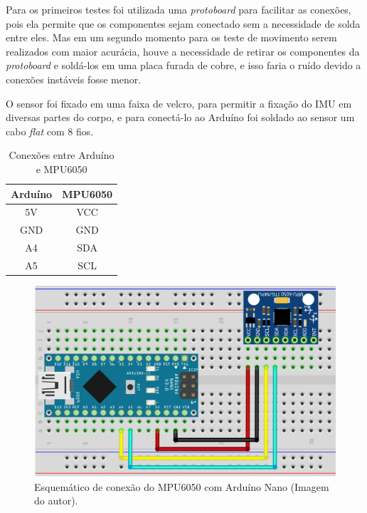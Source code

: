 		Para os primeiros testes foi utilizada uma \textit{protoboard} para facilitar as conexões, pois ela permite que os componentes sejam conectado sem a necessidade de solda entre eles. Mas em um segundo momento para os teste de movimento serem realizados com maior acurácia, houve a necessidade de retirar os componentes da \textit{protoboard} e soldá-los em uma placa furada de cobre, e isso faria o ruído devido a conexões instáveis fosse menor.
		
		O sensor foi fixado em uma faixa de velcro, para permitir a fixação do IMU em diversas partes do corpo, e para conectá-lo ao Arduíno foi soldado ao sensor um cabo \textit{flat} com 8 fios.
		
		\begin{table}[h] \footnotesize
			\centering
			\caption{Conexões entre Arduíno e MPU6050}
			\label{conexoes_arduino}
			
			\begin{tabular}{cc}
				\toprule
				\textbf{Arduíno} & \textbf{MPU6050} \\
				\midrule
				5V & VCC \\
				GND & GND \\
				A4 & SDA \\
				A5 & SCL \\
				\bottomrule
			
			\end{tabular}
		\end{table}
		
		\begin{figure}[h]
			\centering
			\includegraphics[keepaspectratio=true,scale=0.5]{figuras/conexoes_mpu_arduino.PNG}
			\caption{ Esquemático de conexão do MPU6050 com Arduíno Nano (Imagem do autor).}
		 \footnotesize
			\label{conexoes}	
		\end{figure}
		
